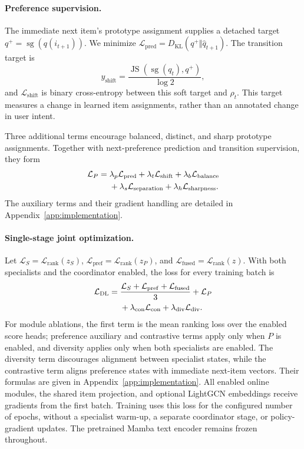 \documentclass[11pt]{article}
\newcommand{\sg}{\operatorname{sg}}
\begin{document}
\paragraph{Preference supervision.}
The immediate next item's prototype assignment supplies a detached target $q^+=\sg(q(i_{t+1}))$. We minimize $\mathcal L_{\mathrm{pred}}=D_{\mathrm{KL}}(q^+\Vert\widehat q_{t+1})$. The transition target is
\begin{equation}
 y_{\mathrm{shift}}=\frac{\operatorname{JS}(\sg(q_t),q^+)}{\log 2},
\end{equation}
and $\mathcal L_{\mathrm{shift}}$ is binary cross-entropy between this soft target and $\rho_t$. This target measures a change in learned item assignments, rather than an annotated change in user intent.

Three additional terms encourage balanced, distinct, and sharp prototype assignments. Together with next-preference prediction and transition supervision, they form
\begin{align}
 \mathcal L_P={}&\lambda_p\mathcal L_{\mathrm{pred}}
 +\lambda_t\mathcal L_{\mathrm{shift}}
 +\lambda_b\mathcal L_{\mathrm{balance}}\nonumber\notag\\
 &+\lambda_s\mathcal L_{\mathrm{separation}}
 +\lambda_h\mathcal L_{\mathrm{sharpness}}.
\end{align}
The auxiliary terms and their gradient handling are detailed in Appendix~\ref{app:implementation}.

\paragraph{Single-stage joint optimization.}
Let $\mathcal L_S=\mathcal L_{\mathrm{rank}}(z_S)$, $\mathcal L_{\mathrm{pref}}=\mathcal L_{\mathrm{rank}}(z_P)$, and $\mathcal L_{\mathrm{fused}}=\mathcal L_{\mathrm{rank}}(z)$. With both specialists and the coordinator enabled, the loss for every training batch is
\begin{align}
 \mathcal L_{\mathrm{DL}}={}&\frac{\mathcal L_S+\mathcal L_{\mathrm{pref}}+\mathcal L_{\mathrm{fused}}}{3}
 +\mathcal L_P\notag\\
 &+\lambda_{\mathrm{con}}\mathcal L_{\mathrm{con}}
 +\lambda_{\mathrm{div}}\mathcal L_{\mathrm{div}}.
 \label{eq:single_stage_loss}
\end{align}
For module ablations, the first term is the mean ranking loss over the enabled score heads; preference auxiliary and contrastive terms apply only when $P$ is enabled, and diversity applies only when both specialists are enabled. The diversity term discourages alignment between specialist states, while the contrastive term aligns preference states with immediate next-item vectors. Their formulas are given in Appendix~\ref{app:implementation}. All enabled online modules, the shared item projection, and optional LightGCN embeddings receive gradients from the first batch. Training uses this loss for the configured number of epochs, without a specialist warm-up, a separate coordinator stage, or policy-gradient updates. The pretrained Mamba text encoder remains frozen throughout.
\end{document}
